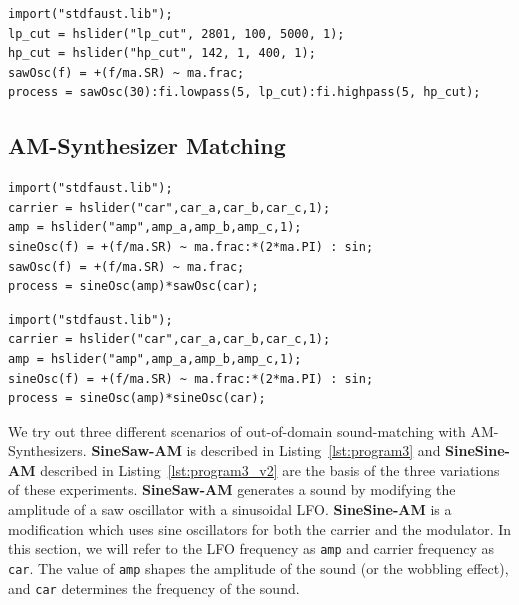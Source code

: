 \documentclass[runningheads]{llncs}
\newcommand{\BPSaw}{\textbf{BP-Saw}\xspace}
\newcommand{\FMMod}{\textbf{SineSaw-AM}\xspace}
\newcommand{\FMModvtwo}{\textbf{SineSine-AM}\xspace}
\begin{document}
\begin{lstlisting}[caption={\BPSaw}, label={lst:program0_saw}, language=Faust,
                  float, floatplacement=!H, xleftmargin=1em, xrightmargin=0.5em, firstnumber=0, aboveskip=0em, belowskip=-1em]
import("stdfaust.lib");
lp_cut = hslider("lp_cut", 2801, 100, 5000, 1);
hp_cut = hslider("hp_cut", 142, 1, 400, 1);
sawOsc(f) = +(f/ma.SR) ~ ma.frac;
process = sawOsc(30):fi.lowpass(5, lp_cut):fi.highpass(5, hp_cut);
\end{lstlisting}


\subsection{AM-Synthesizer Matching}
\begin{lstlisting}[caption={\FMMod}, label={lst:program3},language=Faust,float,floatplacement=!H,xleftmargin=1em,xrightmargin=0.5em,firstnumber=0,aboveskip=0em, belowskip=-1em]
import("stdfaust.lib");
carrier = hslider("car",car_a,car_b,car_c,1);
amp = hslider("amp",amp_a,amp_b,amp_c,1);
sineOsc(f) = +(f/ma.SR) ~ ma.frac:*(2*ma.PI) : sin;
sawOsc(f) = +(f/ma.SR) ~ ma.frac;
process = sineOsc(amp)*sawOsc(car);
\end{lstlisting}


\begin{lstlisting}[caption={\FMModvtwo}, label={lst:program3_v2},language=Faust,float,floatplacement=!H,xleftmargin=1em,xrightmargin=0.5em,firstnumber=0,aboveskip=0em, belowskip=-1em]
import("stdfaust.lib");
carrier = hslider("car",car_a,car_b,car_c,1);
amp = hslider("amp",amp_a,amp_b,amp_c,1);
sineOsc(f) = +(f/ma.SR) ~ ma.frac:*(2*ma.PI) : sin;
process = sineOsc(amp)*sineOsc(car);
\end{lstlisting}


\label{sec:am_sound_matching}
We try out three different scenarios of out-of-domain sound-matching with AM-Synthesizers. \FMMod is described in Listing~\ref{lst:program3} and \FMModvtwo described in Listing~\ref{lst:program3_v2} are the basis of the three variations of these experiments. \FMMod generates a sound by modifying the amplitude of a saw oscillator with a sinusoidal LFO. \FMModvtwo is a modification which uses sine oscillators for both the carrier and the modulator. In this section, we will refer to the LFO frequency as \texttt{amp} and carrier frequency as \texttt{car}. The value of \texttt{amp} shapes the amplitude of the sound (or the wobbling effect), and \texttt{car} determines the frequency of the sound.
\end{document}
